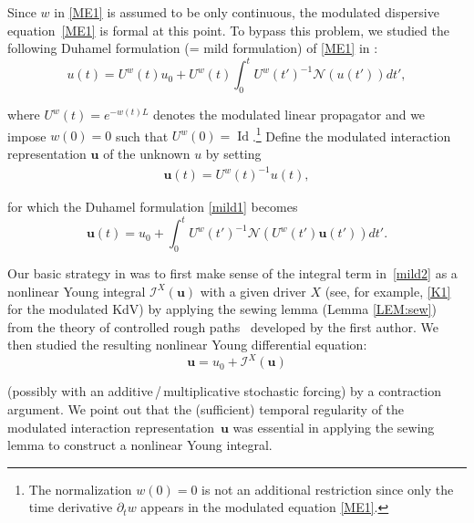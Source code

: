 \documentclass[letterpaper, 11pt,  reqno]{amsart}
\DeclareMathOperator{\Id}{Id}
\newcommand{\1}{\hspace{0.5mm}\text{I}\hspace{0.5mm}}
\newcommand{\I}{\mathcal{I}}
\newcommand{\noi}{\noindent}
\newcommand{\dt}{\partial_t}
\newcommand{\NN}{\mathcal{N}}
\newcommand{\uw}{U^w}
\newcommand{\uu}{\mathbf{u}}
\numberwithin{equation}{section}
\numberwithin{theorem}{section}
\begin{document}
Since $w$ in \eqref{ME1}
is assumed to be  only continuous, 
the modulated dispersive equation~\eqref{ME1} 
is  formal at this point.
To bypass this problem, 
 we studied 
 the following 
 Duhamel formulation (= mild formulation) of \eqref{ME1}
 in \cite{CG1, CGLLO1}:
\begin{equation}
u(t) = U^w(t) u_0 +  U^w({t}) \int_0^t  U^w({t'})^{-1}\NN( u(t') ) dt', 
\label{mild1}
\end{equation}


\noi
where $U^w(t) = e^{- w(t) L }$ denotes the modulated linear propagator
and we impose $w(0) = 0$ such that  
 $U^w(0) = \Id$.\footnote{The normalization $w(0) = 0$
 is not an additional restriction since only the time derivative $\dt w$
 appears in the modulated equation \eqref{ME1}.}
Define
 the 
 modulated interaction representation
$\uu$ of the unknown $u$ by setting
\begin{align}
\uu(t)=\uw(t)^{-1}u(t), 
\label{int1} 
\end{align}

\noi
for which 
the Duhamel formulation \eqref{mild1}
becomes 
\begin{equation}
\uu(t) = u_0 + \int_0 ^t \uw(t')^{-1}\NN(\uw(t') \uu(t'))dt'.
\label{mild2}
\end{equation}

\noi
Our basic strategy 
in \cite{CGLLO1, CGLLO2}
was 
to first make sense of the integral term in~\eqref{mild2}
as a  nonlinear Young integral
$\I^X(\uu)$ with a given driver $X$
(see, for example, \eqref{K1}
for the modulated KdV)
by applying  the sewing lemma  (Lemma \ref{LEM:sew})
from 
the theory of controlled rough paths~\cite{Gub04}
developed by the first author.
We then studied 
the resulting nonlinear Young differential equation:
\begin{equation}
\uu = u_0 + \I^X(\uu)
\label{YDE0}
\end{equation}

\noi
(possibly with an additive\,/\,multiplicative stochastic forcing)
by a contraction argument. 
We point out that 
 the (sufficient) temporal regularity of
the modulated interaction representation~$\uu$
was essential 
in applying the sewing lemma 
to construct
a nonlinear Young integral.


%

\end{document}

